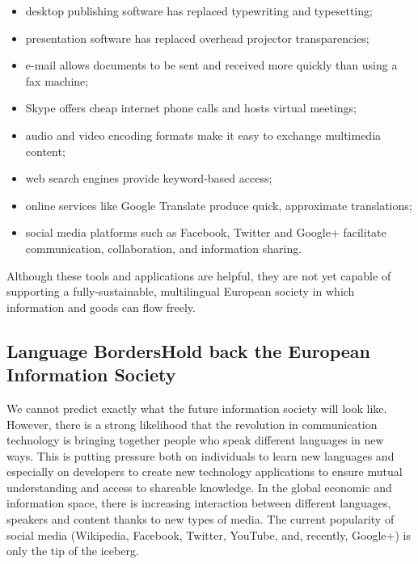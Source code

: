 \begin{multicols}{2}
\begin{itemize}
\item desktop publishing software has replaced typewriting and typesetting;
\item presentation software has replaced overhead projector transparencies;
\item e-mail allows documents to be sent and received more quickly than using a fax machine;
\item Skype offers cheap internet phone calls and hosts virtual meetings;
\item audio and video encoding formats make it easy to exchange multimedia content;
\item web search engines provide keyword-based access;
\item online services like Google Translate produce quick, approximate translations;
\item social media platforms such as Facebook, Twitter and Google+ facilitate communication, collaboration, and information sharing.
\end{itemize}

Although these tools and applications are helpful, they are not yet capable of supporting a fully-sustainable, multilingual European society in which information and goods can flow freely.

\subsection[Language Borders Hold back the European Information Society]{Language Borders\newline Hold back the European Information Society}

We cannot predict exactly what the future information society will look like. However, there is a strong likelihood that the revolution in communication technology is bringing together people who speak different languages in new ways. This is putting pressure both on individuals to learn new languages and especially on developers to create new technology applications to ensure mutual understanding and access to shareable knowledge. In the global economic and information space, there is increasing interaction between different languages, speakers and content thanks to new types of media. The current popularity of social media (Wikipedia, Facebook, Twitter, YouTube, and, recently, Google+) is only the tip of the iceberg.



\end{multicols}
